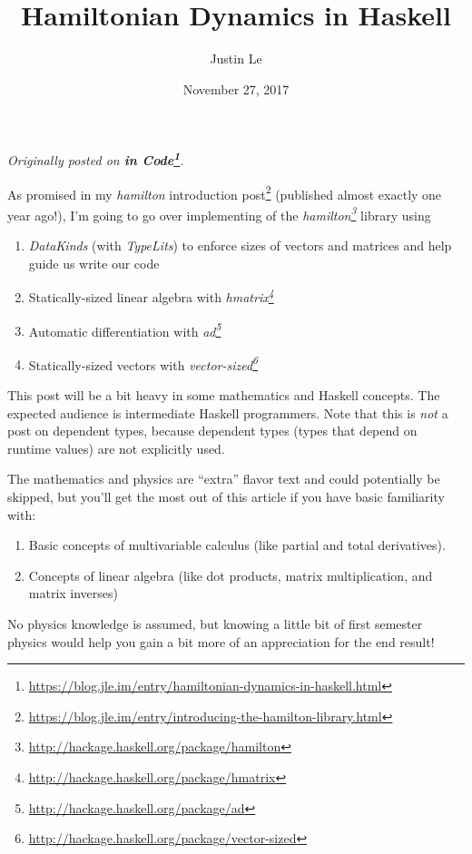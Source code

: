 \documentclass[]{article}
\title{Hamiltonian Dynamics in Haskell}
\author{Justin Le}
\date{November 27, 2017}
\renewcommand{\href}[2]{#2\footnote{\url{#1}}}
\begin{document}
\maketitle

\emph{Originally posted on
\textbf{\href{https://blog.jle.im/entry/hamiltonian-dynamics-in-haskell.html}{in
Code}}.}

As promised in my
\href{https://blog.jle.im/entry/introducing-the-hamilton-library.html}{\emph{hamilton}
introduction post} (published almost exactly one year ago!), I'm going to go
over implementing of the
\emph{\href{http://hackage.haskell.org/package/hamilton}{hamilton}} library
using

\begin{enumerate}
\def\labelenumi{\arabic{enumi}.}
\tightlist
\item
  \emph{DataKinds} (with \emph{TypeLits}) to enforce sizes of vectors and
  matrices and help guide us write our code
\item
  Statically-sized linear algebra with
  \emph{\href{http://hackage.haskell.org/package/hmatrix}{hmatrix}}
\item
  Automatic differentiation with
  \emph{\href{http://hackage.haskell.org/package/ad}{ad}}
\item
  Statically-sized vectors with
  \emph{\href{http://hackage.haskell.org/package/vector-sized}{vector-sized}}
\end{enumerate}

This post will be a bit heavy in some mathematics and Haskell concepts. The
expected audience is intermediate Haskell programmers. Note that this is
\emph{not} a post on dependent types, because dependent types (types that depend
on runtime values) are not explicitly used.

The mathematics and physics are ``extra'' flavor text and could potentially be
skipped, but you'll get the most out of this article if you have basic
familiarity with:

\begin{enumerate}
\def\labelenumi{\arabic{enumi}.}
\tightlist
\item
  Basic concepts of multivariable calculus (like partial and total derivatives).
\item
  Concepts of linear algebra (like dot products, matrix multiplication, and
  matrix inverses)
\end{enumerate}

No physics knowledge is assumed, but knowing a little bit of first semester
physics would help you gain a bit more of an appreciation for the end result!
\end{document}
